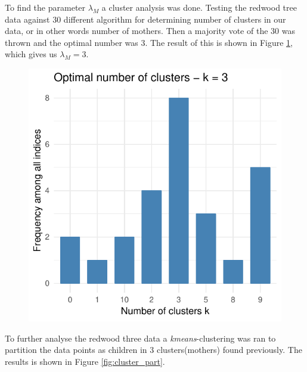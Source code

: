To find the parameter $\lambda_M$ a cluster analysis was done. Testing the redwood tree data against $30$ different algorithm for determining number of clusters in our data, or in other words number of mothers. Then a majority vote of the $30$ was thrown and the optimal number was $3$. The result of this is shown in Figure \ref{fig:numb_clust}, which gives us $\lambda_M = 3$. 
\begin{figure}
    \centering
    \includegraphics[scale=0.95]{figures/numb_clusters.pdf}
    \caption{}
    \label{fig:numb_clust}
\end{figure}
To further analyse the redwood three data a \textit{kmeans}-clustering was ran to partition the data points as children in $3$ clusters(mothers) found previously. The results is shown in Figure \ref{fig:cluster_part}. 
